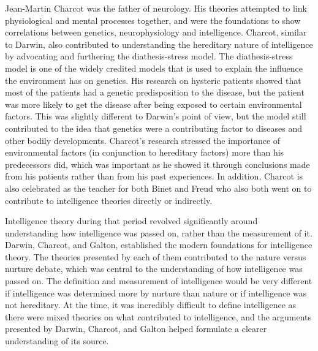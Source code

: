 \documentclass[12pt, oneside]{article}
\begin{document}
\par Jean-Martin Charcot was the father of neurology. His theories attempted to link physiological and mental processes together, and were the foundations to show correlations between genetics, neurophysiology and intelligence. Charcot, similar to Darwin, also contributed to understanding the hereditary nature of intelligence by advocating and furthering the diathesis-stress model. The diathesis-stress model is one of the widely credited models that is used to explain the influence the environment has on genetics. His research on hysteric patients showed that most of the patients had a genetic predisposition to the disease, but the patient was more likely to get the disease after being exposed to certain environmental factors. This was slightly different to Darwin's point of view, but the model still contributed to the idea that genetics were a contributing factor to diseases and other bodily developments. Charcot's research stressed the importance of environmental factors (in conjunction to hereditary factors) more than his predecessors did, which was important as he showed it through conclusions made from his patients rather than from his past experiences. In addition, Charcot is also celebrated as the teacher for both Binet and Freud who also both went on to contribute to intelligence theories directly or indirectly.

\par Intelligence theory during that period revolved significantly around understanding how intelligence was passed on, rather than the measurement of it. Darwin, Charcot, and Galton, established the modern foundations for intelligence theory. The theories presented by each of them contributed to the nature versus nurture debate, which was central to the understanding of how intelligence was passed on. The definition and measurement of intelligence would be very different if intelligence was determined more by nurture than nature or if intelligence was not hereditary. At the time, it was incredibly difficult to define intelligence as there were mixed theories on what contributed to intelligence, and the arguments presented by Darwin, Charcot, and Galton helped formulate a clearer understanding of its source.
\end{document}
